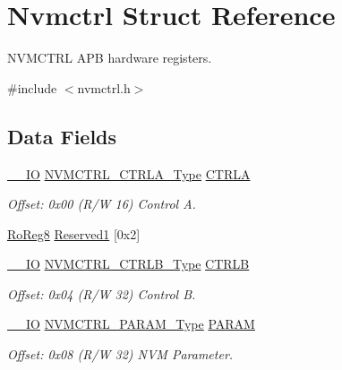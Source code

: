 \hypertarget{struct_nvmctrl}{}\section{Nvmctrl Struct Reference}
\label{struct_nvmctrl}


N\+V\+M\+C\+T\+RL A\+PB hardware registers.  




{\ttfamily \#include $<$nvmctrl.\+h$>$}

\subsection*{Data Fields}
\begin{DoxyCompactItemize}
\item 
\mbox{\hyperlink{core__cm0plus_8h_aec43007d9998a0a0e01faede4133d6be}{\+\_\+\+\_\+\+IO}} \mbox{\hyperlink{union_n_v_m_c_t_r_l___c_t_r_l_a___type}{N\+V\+M\+C\+T\+R\+L\+\_\+\+C\+T\+R\+L\+A\+\_\+\+Type}} \mbox{\hyperlink{struct_nvmctrl_abed8e63e79f5f580404555db2fe3687f}{C\+T\+R\+LA}}
\begin{DoxyCompactList}\small\item\em Offset\+: 0x00 (R/W 16) Control A. \end{DoxyCompactList}\item 
\mbox{\hyperlink{group___s_a_m_d21_e15_a__definitions_ga0d957f1433aaf5d70e4dc2b68288442d}{Ro\+Reg8}} \mbox{\hyperlink{struct_nvmctrl_a3e42d171d4eb8eda7a030a3453f2d9c0}{Reserved1}} \mbox{[}0x2\mbox{]}
\item 
\mbox{\hyperlink{core__cm0plus_8h_aec43007d9998a0a0e01faede4133d6be}{\+\_\+\+\_\+\+IO}} \mbox{\hyperlink{union_n_v_m_c_t_r_l___c_t_r_l_b___type}{N\+V\+M\+C\+T\+R\+L\+\_\+\+C\+T\+R\+L\+B\+\_\+\+Type}} \mbox{\hyperlink{struct_nvmctrl_a6ce397bffd9c81063a72fb9947dd8163}{C\+T\+R\+LB}}
\begin{DoxyCompactList}\small\item\em Offset\+: 0x04 (R/W 32) Control B. \end{DoxyCompactList}\item 
\mbox{\hyperlink{core__cm0plus_8h_aec43007d9998a0a0e01faede4133d6be}{\+\_\+\+\_\+\+IO}} \mbox{\hyperlink{union_n_v_m_c_t_r_l___p_a_r_a_m___type}{N\+V\+M\+C\+T\+R\+L\+\_\+\+P\+A\+R\+A\+M\+\_\+\+Type}} \mbox{\hyperlink{struct_nvmctrl_ab90ff7c4565b7c2e2da76c4076ad6c6d}{P\+A\+R\+AM}}
\begin{DoxyCompactList}\small\item\em Offset\+: 0x08 (R/W 32) N\+VM Parameter. \end{DoxyCompactList}\item 

\end{DoxyCompactItemize}
